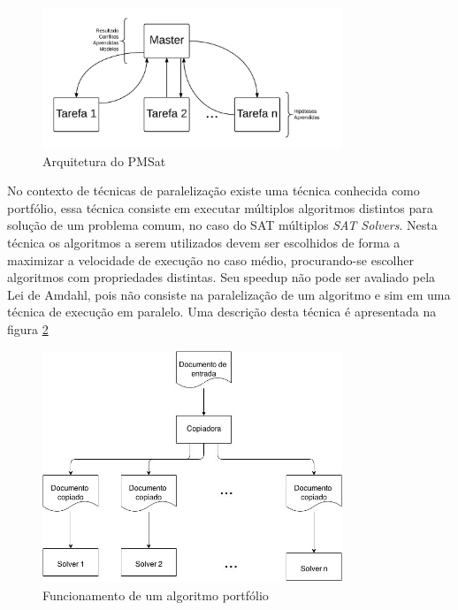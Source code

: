 \documentclass{ufsc-thesis}
\begin{document}
\begin{figure}[H]
    \centering
    \includegraphics[width=0.8\textwidth]{figuras/PMSat.jpeg}
    \caption{Arquitetura do PMSat}
    \label{fig:PMSat}
\end{figure}


No contexto de técnicas de paralelização existe uma técnica conhecida como portfólio, essa 
técnica consiste em executar múltiplos algoritmos distintos para solução de um problema 
comum, no caso do SAT múltiplos \textit{SAT Solvers}. Nesta técnica os algoritmos a serem 
utilizados devem ser escolhidos de forma a maximizar a velocidade de execução no caso médio, 
procurando-se escolher algoritmos com propriedades distintas. Seu speedup não pode ser avaliado 
pela Lei de Amdahl, pois não consiste na paralelização de um algoritmo e sim em uma técnica de 
execução em paralelo. Uma descrição desta técnica é apresentada na 
figura \ref{fig:port}

\begin{figure}[H]
    \centering
    \includegraphics[width=0.8\textwidth]{figuras/portfolio.jpg}
    \caption{Funcionamento de um algoritmo portfólio\cite{nelson2013new}}
    \label{fig:port}
\end{figure}
\end{document}
